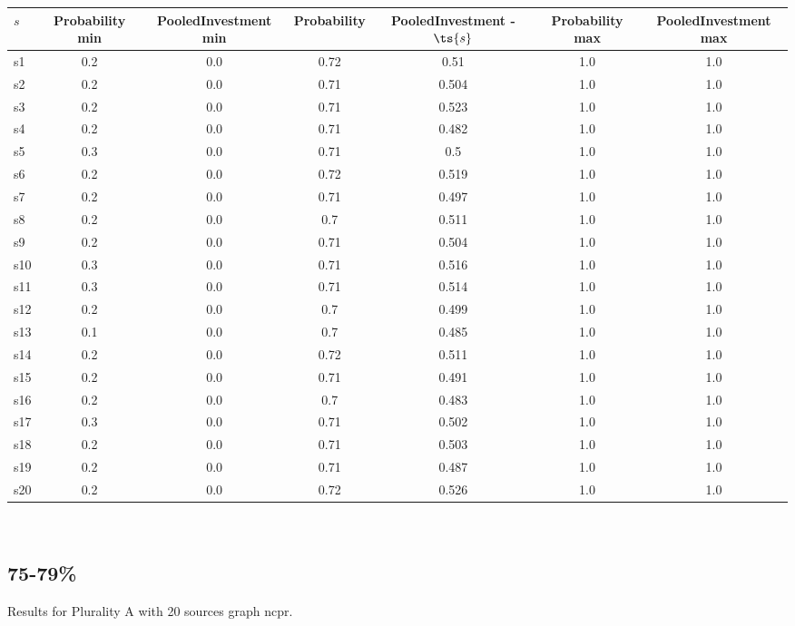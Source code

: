 \documentclass{article}
\begin{document}
\noindent\begin{tabular}{|l|c|c|c|c|c|c|}
\hline
$s$& Probability min & PooledInvestment min & Probability & PooledInvestment - $\ts{s}$ & Probability max & PooledInvestment max\\
\hline
s1 &0.2 & 0.0 & 0.72 & 0.51 & 1.0 & 1.0\\
\hline
s2 &0.2 & 0.0 & 0.71 & 0.504 & 1.0 & 1.0\\
\hline
s3 &0.2 & 0.0 & 0.71 & 0.523 & 1.0 & 1.0\\
\hline
s4 &0.2 & 0.0 & 0.71 & 0.482 & 1.0 & 1.0\\
\hline
s5 &0.3 & 0.0 & 0.71 & 0.5 & 1.0 & 1.0\\
\hline
s6 &0.2 & 0.0 & 0.72 & 0.519 & 1.0 & 1.0\\
\hline
s7 &0.2 & 0.0 & 0.71 & 0.497 & 1.0 & 1.0\\
\hline
s8 &0.2 & 0.0 & 0.7 & 0.511 & 1.0 & 1.0\\
\hline
s9 &0.2 & 0.0 & 0.71 & 0.504 & 1.0 & 1.0\\
\hline
s10 &0.3 & 0.0 & 0.71 & 0.516 & 1.0 & 1.0\\
\hline
s11 &0.3 & 0.0 & 0.71 & 0.514 & 1.0 & 1.0\\
\hline
s12 &0.2 & 0.0 & 0.7 & 0.499 & 1.0 & 1.0\\
\hline
s13 &0.1 & 0.0 & 0.7 & 0.485 & 1.0 & 1.0\\
\hline
s14 &0.2 & 0.0 & 0.72 & 0.511 & 1.0 & 1.0\\
\hline
s15 &0.2 & 0.0 & 0.71 & 0.491 & 1.0 & 1.0\\
\hline
s16 &0.2 & 0.0 & 0.7 & 0.483 & 1.0 & 1.0\\
\hline
s17 &0.3 & 0.0 & 0.71 & 0.502 & 1.0 & 1.0\\
\hline
s18 &0.2 & 0.0 & 0.71 & 0.503 & 1.0 & 1.0\\
\hline
s19 &0.2 & 0.0 & 0.71 & 0.487 & 1.0 & 1.0\\
\hline
s20 &0.2 & 0.0 & 0.72 & 0.526 & 1.0 & 1.0\\
\hline
\end{tabular}\\

\newpage

\subsection{75-79\%}

\noindent Results for Plurality A with 20 sources graph ncpr.
\end{document}
